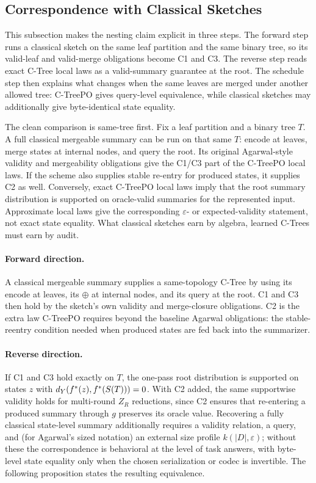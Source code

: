 \subsection{Correspondence with Classical Sketches}
\label{sec:v7-ctreepo-correspondence}

This subsection makes the nesting claim explicit in three steps. The
forward step runs a classical sketch on the same leaf partition and the
same binary tree, so its valid-leaf and valid-merge obligations become
C1 and C3. The reverse step reads exact C-Tree local laws as a
valid-summary guarantee at the root. The schedule step then explains
what changes when the same leaves are merged under another allowed
tree: C-TreePO gives query-level equivalence, while classical sketches
may additionally give byte-identical state equality.

The clean comparison is same-tree first. Fix a leaf partition and a
binary tree \(T\). A full classical mergeable summary can be run on
that same \(T\): encode at leaves, merge states at internal nodes, and
query the root. Its original Agarwal-style validity and mergeability
obligations give the C1/C3 part of the C-TreePO local laws. If the
scheme also supplies stable re-entry for produced states, it supplies
C2 as well. Conversely, exact C-TreePO local laws imply that the root
summary distribution is supported on oracle-valid summaries for the
represented input. Approximate local laws give the corresponding
\(\varepsilon\)- or expected-validity statement, not exact state
equality. What classical sketches earn by algebra, learned C-Trees
must earn by audit.

\paragraph{Forward direction.}
A classical mergeable summary supplies a same-topology C-Tree by using
its \(\mathrm{encode}\) at leaves, its \(\oplus\) at internal nodes,
and its \(\mathrm{query}\) at the root. C1 and C3 then hold by the
sketch's own validity and merge-closure obligations. C2 is the extra
law C-TreePO requires beyond the baseline Agarwal obligations: the
stable-reentry condition needed when produced states are fed back into
the summarizer.

\paragraph{Reverse direction.}
If C1 and C3 hold exactly on \(T\), the one-pass root distribution is
supported on states \(z\) with \(d_Y(f^\ast(z),f^\ast(S(T)))=0\). With
C2 added, the same supportwise validity holds for multi-round \(Z_R\)
reductions, since C2 ensures that re-entering a produced summary
through \(g\) preserves its oracle value. Recovering a fully classical
state-level summary additionally requires a validity relation, a
query, and (for Agarwal's sized notation) an external size profile
\(k(|D|,\varepsilon)\); without these the correspondence is
behavioral at the level of task answers, with byte-level state equality
only when the chosen serialization or codec is invertible. The
following proposition states the resulting equivalence.


